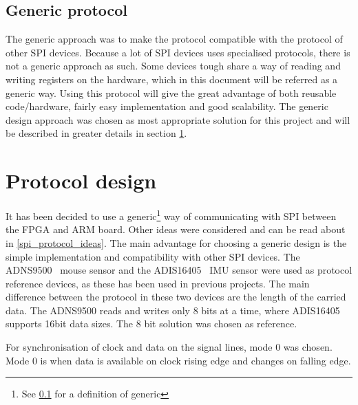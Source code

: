 \subsection{Generic protocol}
\label{spi_generic_protocol}
The generic approach was to make the protocol compatible with the protocol of other SPI devices. Because a lot of SPI devices uses specialised protocols, there is not a generic approach as such. Some devices tough share a way of reading and writing registers on the hardware, which in this document will be referred as a generic way. Using this protocol will give the great advantage of both reusable code/hardware, fairly easy implementation and good scalability. The generic design approach was chosen as most appropriate solution for this project and will be described in greater details in section \ref{spi_rotocol_design}.





\section{Protocol design}
\label{spi_rotocol_design}
It has been decided to use a generic\footnote{See \ref{spi_generic_protocol} for a definition of generic} way of communicating with SPI between the FPGA and ARM board. Other ideas were considered and can be read about in \ref{spi_protocol_ideas}.
The main advantage for choosing a generic design is the simple implementation and compatibility with other SPI devices. The ADNS9500~\cite{SPI_ADNS} mouse sensor and the ADIS16405~\cite{SPI_ADIS} IMU sensor were used as protocol reference devices, as these has been used in previous projects. The main difference between the protocol in these two devices are the length of the carried data. The ADNS9500 reads and writes only 8 bits at a time, where ADIS16405 supports 16bit data sizes. The 8 bit solution was chosen as reference.

For synchronisation of clock and data on the signal lines, mode 0 was chosen. Mode 0 is when data is available on clock rising edge and changes on falling edge.

